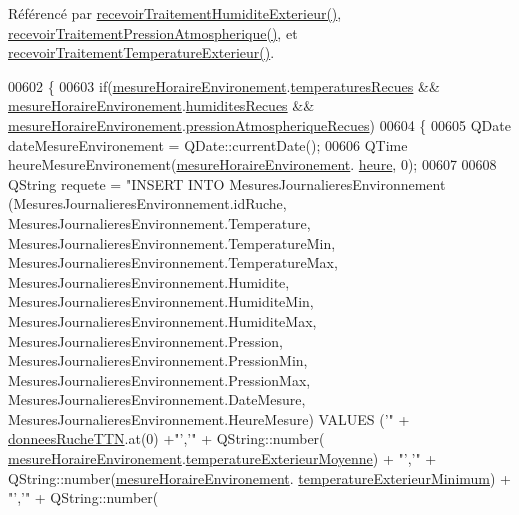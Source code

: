 Référencé par \hyperlink{class_ruche_a59e89246b484d7b63851c0ebd20af6c5}{recevoir\+Traitement\+Humidite\+Exterieur()}, \hyperlink{class_ruche_aa42daeffa023c83fde40072601e1fa39}{recevoir\+Traitement\+Pression\+Atmospherique()}, et \hyperlink{class_ruche_a8482dda95a8a7888d5a60ea6f7d8729e}{recevoir\+Traitement\+Temperature\+Exterieur()}.


\begin{DoxyCode}
00602 \{
00603     \textcolor{keywordflow}{if}(\hyperlink{class_ruche_a73a826506110c10d9221065670985e52}{mesureHoraireEnvironement}.\hyperlink{struct_mesure_horaire_environement_a3444440b836c4893e8d61c3eb5c3e42d}{temperaturesRecues} && 
      \hyperlink{class_ruche_a73a826506110c10d9221065670985e52}{mesureHoraireEnvironement}.\hyperlink{struct_mesure_horaire_environement_a4348771984d70b9ea7867dba511db336}{humiditesRecues} && 
      \hyperlink{class_ruche_a73a826506110c10d9221065670985e52}{mesureHoraireEnvironement}.\hyperlink{struct_mesure_horaire_environement_a5db5e56af7d297b500912489126f7305}{pressionAtmospheriqueRecues})
00604     \{
00605         QDate dateMesureEnvironement = QDate::currentDate();
00606         QTime heureMesureEnvironement(\hyperlink{class_ruche_a73a826506110c10d9221065670985e52}{mesureHoraireEnvironement}.
      \hyperlink{struct_mesure_horaire_environement_a83295c95940d9edae2d082a94f49e1c9}{heure}, 0);
00607 
00608         QString requete = \textcolor{stringliteral}{"INSERT INTO MesuresJournalieresEnvironnement
       (MesuresJournalieresEnvironnement.idRuche, MesuresJournalieresEnvironnement.Temperature, MesuresJournalieresEnvironnement.TemperatureMin,
       MesuresJournalieresEnvironnement.TemperatureMax, MesuresJournalieresEnvironnement.Humidite,
       MesuresJournalieresEnvironnement.HumiditeMin, MesuresJournalieresEnvironnement.HumiditeMax,
       MesuresJournalieresEnvironnement.Pression, MesuresJournalieresEnvironnement.PressionMin, MesuresJournalieresEnvironnement.PressionMax,
       MesuresJournalieresEnvironnement.DateMesure, MesuresJournalieresEnvironnement.HeureMesure) VALUES ('"} + 
      \hyperlink{class_ruche_a4556832042641c08a6ef2ab9d80d771e}{donneesRucheTTN}.at(0) +\textcolor{stringliteral}{"','"} + QString::number(
      \hyperlink{class_ruche_a73a826506110c10d9221065670985e52}{mesureHoraireEnvironement}.\hyperlink{struct_mesure_horaire_environement_a40be086e9b2454c0e70066a523a1b066}{temperatureExterieurMoyenne}) 
      + \textcolor{stringliteral}{"','"} + QString::number(\hyperlink{class_ruche_a73a826506110c10d9221065670985e52}{mesureHoraireEnvironement}.
      \hyperlink{struct_mesure_horaire_environement_ae9737a62128ecf2614901ebe0b118548}{temperatureExterieurMinimum}) + \textcolor{stringliteral}{"','"} + QString::number(

\end{DoxyCode}
